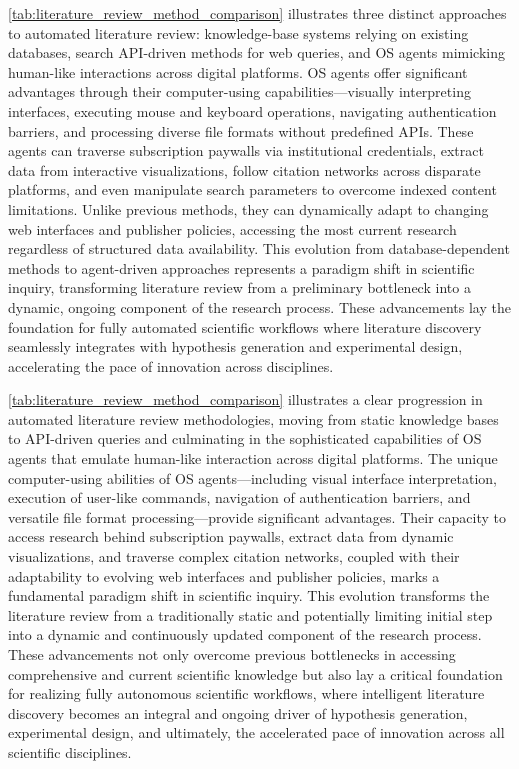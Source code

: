 \autoref{tab:literature_review_method_comparison} illustrates three distinct approaches to automated literature review: knowledge-base systems relying on existing databases, search API-driven methods for web queries, and OS agents mimicking human-like interactions across digital platforms. OS agents offer significant advantages through their computer-using capabilities—visually interpreting interfaces, executing mouse and keyboard operations, navigating authentication barriers, and processing diverse file formats without predefined APIs. These agents can traverse subscription paywalls via institutional credentials, extract data from interactive visualizations, follow citation networks across disparate platforms, and even manipulate search parameters to overcome indexed content limitations. Unlike previous methods, they can dynamically adapt to changing web interfaces and publisher policies, accessing the most current research regardless of structured data availability. This evolution from database-dependent methods to agent-driven approaches represents a paradigm shift in scientific inquiry, transforming literature review from a preliminary bottleneck into a dynamic, ongoing component of the research process. These advancements lay the foundation for fully automated scientific workflows where literature discovery seamlessly integrates with hypothesis generation and experimental design, accelerating the pace of innovation across disciplines.

\autoref{tab:literature_review_method_comparison} illustrates a clear progression in automated literature review methodologies, moving from static knowledge bases to API-driven queries and culminating in the sophisticated capabilities of OS agents that emulate human-like interaction across digital platforms. The unique computer-using abilities of OS agents—including visual interface interpretation, execution of user-like commands, navigation of authentication barriers, and versatile file format processing—provide significant advantages. Their capacity to access research behind subscription paywalls, extract data from dynamic visualizations, and traverse complex citation networks, coupled with their adaptability to evolving web interfaces and publisher policies, marks a fundamental paradigm shift in scientific inquiry. This evolution transforms the literature review from a traditionally static and potentially limiting initial step into a dynamic and continuously updated component of the research process. These advancements not only overcome previous bottlenecks in accessing comprehensive and current scientific knowledge but also lay a critical foundation for realizing fully autonomous scientific workflows, where intelligent literature discovery becomes an integral and ongoing driver of hypothesis generation, experimental design, and ultimately, the accelerated pace of innovation across all scientific disciplines.

